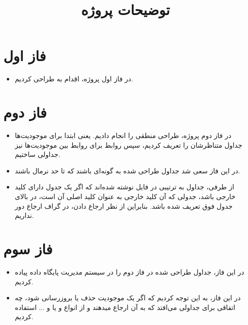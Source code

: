 \documentclass{article}
\title{توضیحات پروژه}
\date{}
\begin{document}
\maketitle

\section{فاز اول}
    \begin{itemize}
        \item    در فاز اول پروژه، اقدام به طراحی  کردیم.
    \end{itemize}
\section{فاز دوم}
    \begin{itemize}
    \item در فاز دوم پروژه، طراحی منطقی را انجام دادیم. یعنی ابتدا برای موجودیت‌ها جداول متناظرشان را تعریف کردیم، سپس روابط برای روابط بین موجودیت‌ها نیز جداولی ساختیم.
        \\
    \item در این فاز سعی شد جداول طراحی شده به گونه‌ای باشند که تا حد 
         نرمال باشند.
        \\
    \item از طرفی، جداول به ترتیبی در فایل نوشته شده‌اند که اگر یک جدول دارای کلید خارجی باشد، جدولی که آن کلید خارجی به عنوان کلید اصلی آن است، در بالای جدول فوق تعریف شده باشد.
        بنابراین از نظر ارجاع دادن، در گراف ارجاع دور نداریم.
    \end{itemize}
\section{فاز سوم}
    \begin{itemize}
        \item در این فاز، جداول طراحی شده در فاز دوم را در سیستم مدیریت پایگاه داده  پیاده کردیم.
        \item در این فاز، به این توجه کردیم که اگر یک موجودیت حذف یا بروزرسانی شود، چه اتفاقی برای جداولی می‌افتد که به آن ارجاع میدهند و از انواع  و یا  و ... استفاده کردیم.
    \end{itemize}
\end{document}
